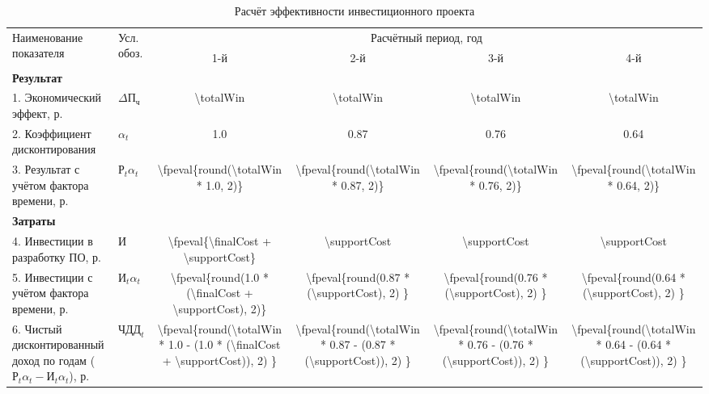 \bgroup
\def\arraystretch{1.1}
\begin{table}
	\caption{Расчёт эффективности инвестиционного проекта}
	\label{table:CHDD}
	\begin{tabular}{|p{3.1cm}|p{1.1cm}|c|c|c|c|}
		\hline
		\multirow{2}{*}{\parbox{3.8cm}{Наименование показателя}}
		& \multirow{2}{1.2cm}{Усл. обоз.}
		& \multicolumn{4}{c|}{Расчётный период, год}
		\\ \cline{3-6}
		& & 1-й & 2-й & 3-й & 4-й
		\\ \hline

		\textbf{Результат}
		& \multicolumn{5}{c|}{}
		\\ \hline

		1. Экономический эффект, р.
		& $\Delta\text{П}_\text{ч}$ %
		& \num{\totalWin}
		& \num{\totalWin}
		& \num{\totalWin}
		& \num{\totalWin}
		\\ \hline

		2. Коэффициент дисконтирования
		& $\alpha_t$
		& \num{1.0}
		& \num{0.87}
		& \num{0.76}
		& \num{0.64}
		\\ \hline

		3. Результат с учётом фактора времени, р.
		& $\text{Р}_t\alpha_t$
		& \num{\fpeval{round(\totalWin * 1.0, 2)}}
		& \num{\fpeval{round(\totalWin * 0.87, 2)}}
		& \num{\fpeval{round(\totalWin * 0.76, 2)}}
		& \num{\fpeval{round(\totalWin * 0.64, 2)}}
		\\ \hline

		\textbf{Затраты }
		& \multicolumn{5}{c|}{}
		\\ \hline

		4. Инвестиции в разработку ПО, р.
		& $\text{И}$
		& \num{\fpeval{\finalCost + \supportCost}}
		& \num{\supportCost}
		& \num{\supportCost}
		& \num{\supportCost}
		\\ \hline

		5. Инвестиции с учётом фактора времени, р.
		& $\text{И}_t\alpha_t$
		& \num{\fpeval{round(1.0 * (\finalCost + \supportCost), 2)}}
		& \num{\fpeval{round(0.87 * (\supportCost), 2)            }}
		& \num{\fpeval{round(0.76 * (\supportCost), 2)            }}
		& \num{\fpeval{round(0.64 * (\supportCost), 2)            }}
		\\ \hline

		6. Чистый дисконтированный доход по годам ($\text{Р}_t\alpha_t -
			\text{И}_t\alpha_t$), р.
		& $\text{ЧДД}_t$
		& \num{\fpeval{round(\totalWin * 1.0  -  (1.0 * (\finalCost +
		\supportCost)), 2)     }}
		& \num{\fpeval{round(\totalWin * 0.87 -  (0.87 * (\supportCost)), 2) }}
		& \num{\fpeval{round(\totalWin * 0.76 -  (0.76 * (\supportCost)), 2) }}
		& \num{\fpeval{round(\totalWin * 0.64 -  (0.64 * (\supportCost)), 2) }}
		\\ \hline
		

\end{tabular}
\end{table}

